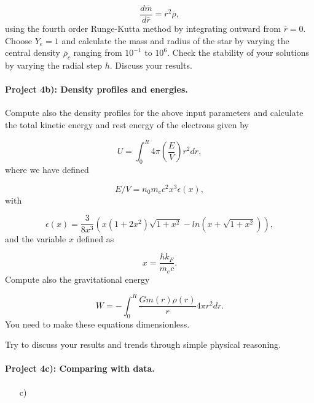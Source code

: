 \documentclass[%
oneside,                 %
final,                   %
10pt]{article}
\begin{document}
\begin{equation*}
\frac{d\overline{m}}{d\overline{r}}=
\overline{r}^{2}\overline{\rho},
\end{equation*}
using the fourth order Runge-Kutta method by integrating outward from $\overline{r}=0$.
Choose $Y_e=1$ and calculate the mass and radius of the star by varying the central density $\overline{\rho}_c$
ranging from $10^{-1}$ to $10^6$. 
Check the stability of your solutions by varying the radial step $h$. 
Discuss your results.

\paragraph{Project 4b): Density profiles and energies.}
Compute also the density profiles for the above input parameters and calculate the total kinetic energy and rest energy
of the electrons given by

\begin{equation*}
   U=\int_0^R4\pi \left( \frac{E}{V}\right )r^2dr,
\end{equation*}
where we have defined

\begin{equation*}
E/V=n_0m_ec^2x^3\epsilon (x),
\end{equation*}
with

\begin{equation*}
\epsilon (x) =
\frac{3}{8x^3}\left( x(1+2x^2)\sqrt{1+x^2}-ln(x+\sqrt{1+x^2})\right),
\end{equation*}
and the variable $x$ defined as

\begin{equation*}
x=\frac{\hbar k_F}{m_ec}.
\end{equation*}
Compute also the gravitational energy

\begin{equation*}
  W=-\int_0^R\frac{Gm(r)\rho(r)}{r}4\pi r^2dr.
\end{equation*}
You need to make these equations dimensionless. 

Try to discuss your results and trends through simple
physical reasoning.

\paragraph{Project 4c): Comparing with data.}
\begin{itemize}
  \item [c)]
\end{itemize}
\end{document}
